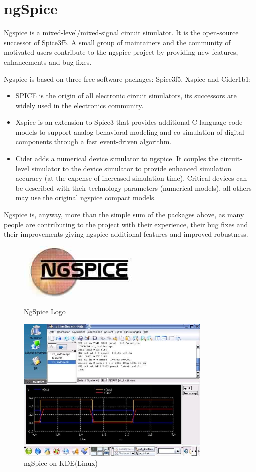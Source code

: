\documentclass[12pt,a4paper]{report}
\begin{document}
\section{ngSpice}
Ngspice is a mixed-level/mixed-signal circuit simulator. It is the open-source successor of Spice3f5. A small group of maintainers and the community of motivated users contribute to the ngspice project by providing new features, enhancements and bug fixes.

Ngspice is based on three free-software packages: Spice3f5, Xspice and Cider1b1:
\begin{itemize}
	\itemsep0em
	\item SPICE is the origin of all electronic circuit simulators, its successors are widely used in the electronics community.
	\item Xspice is an extension to Spice3 that provides additional C language code models to support analog behavioral modeling and co-simulation of digital components through a fast event-driven algorithm.
	\item Cider adds a numerical device simulator to ngspice. It couples the circuit-level simulator to the device simulator to provide enhanced simulation accuracy (at the expense of increased simulation time). Critical devices can be described with their technology parameters (numerical models), all others may use the original ngspice compact models.
\end{itemize}

Ngspice is, anyway, more than the simple sum of the packages above, as many people are contributing to the project with their experience, their bug fixes and their improvements giving ngspice additional features and improved robustness.

\begin{figure}[h]
	\centering
	\includegraphics[scale=0.5]{ngspice-logo}
	\caption{NgSpice Logo}
	\vspace{5mm}
	\includegraphics[height=7cm]{ngspice}
	\caption{ngSpice on KDE(Linux)}
\end{figure}
\end{document}
